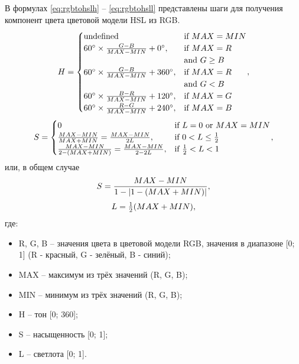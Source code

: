 \documentclass[a4paper,14pt, unknownkeysallowed]{extreport}
\begin{document}
    В формулах \ref{eq:rgbtohslh} -- \ref{eq:rgbtohsll} представлены шаги для получения компонент цвета цветовой модели HSL из RGB.
\begin{equation}
	{\label{eq:rgbtohslh}\displaystyle H={\begin{cases}{\mbox{undefined}}&{\mbox{if }}MAX=MIN\\60^{\circ }\times {\frac {G-B}{MAX-MIN}}+0^{\circ },&{\mbox{if }}MAX=R\\&{\mbox{and }}G\geq B\\60^{\circ }\times {\frac {G-B}{MAX-MIN}}+360^{\circ },&{\mbox{if }}MAX=R\\&{\mbox{and }}G<B\\60^{\circ }\times {\frac {B-R}{MAX-MIN}}+120^{\circ },&{\mbox{if }}MAX=G\\60^{\circ }\times {\frac {R-G}{MAX-MIN}}+240^{\circ },&{\mbox{if }}MAX=B\end{cases}},}
\end{equation}
\begin{equation}
	{\label{eq:rgbtohsls0}\displaystyle S={\begin{cases}0&{\mbox{if }}L=0{\mbox{ or }}MAX=MIN\\{\frac {MAX-MIN}{MAX+MIN}}={\frac {MAX-MIN}{2L}},&{\mbox{if }}0<L\leq {\frac {1}{2}}\\{\frac {MAX-MIN}{2-(MAX+MIN)}}={\frac {MAX-MIN}{2-2L}},&{\mbox{if }}{\frac {1}{2}}<L<1\\\end{cases}},}
\end{equation} или, в общем случае
\begin{equation}
	{\label{eq:rgbtohsls1}\displaystyle S={\frac {MAX-MIN}{1-|1-(MAX+MIN)|}},}
\end{equation}
\begin{equation}
	{\label{eq:rgbtohsll}\displaystyle L={\begin{matrix}{\frac {1}{2}}\end{matrix}}(MAX+MIN),}
\end{equation} где:
\begin{itemize}
	\item R, G, B -- значения цвета в цветовой модели RGB, значения в диапазоне [0; 1] (R - красный, G - зелёный, B - синий);
	\item MAX -- максимум из трёх значений (R, G, B);
	\item MIN -- минимум из трёх значений (R, G, B);
	\item H -- тон [0; 360];
	\item S -- насыщенность [0; 1];
	\item L -- светлота [0; 1].
\end{itemize}
\end{document}
